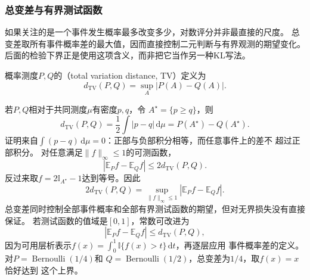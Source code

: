 \subsubsection{总变差与有界测试函数}

如果关注的是一个事件发生概率最多改变多少，对数评分并非最直接的尺度。
总变差取所有事件概率差的最大值，因而直接控制二元判断与有界观测的期望变化。
后面的检验下界正是使用这项含义，而非把它当作另一种KL写法。
\begin{definition}[总变差距离]
\label{def:information-total-variation}
概率测度\(P,Q\)的（total variation distance, TV）定义为
\begin{equation}
  d_{\mathrm{TV}}(P,Q)
  =
  \sup_{A}|P(A)-Q(A)|.
  \label{eq:information-total-variation}
\end{equation}
\end{definition}
若\(P,Q\)相对于共同测度\(\mu\)有密度\(p,q\)，令
\(A^\star=\{p\geq q\}\)，则
\begin{equation}
  d_{\mathrm{TV}}(P,Q)
  =
  \frac12\int|p-q|\,\mathrm{d}\mu
  =
  P(A^\star)-Q(A^\star).
  \label{eq:information-tv-density}
\end{equation}
证明来自\(\int(p-q)\,\mathrm{d}\mu=0\)：正部与负部积分相等，而任意事件上的差不
超过正部积分。
对任意满足\(\lVert f\rVert_\infty\leq1\)的可测函数，
\[
  |\mathbb{E}_P f-\mathbb{E}_Q f|
  \leq2d_{\mathrm{TV}}(P,Q).
\]
反过来取\(f=2\mathbb{I}_{A^\star}-1\)达到等号。因此
\begin{equation}
  2d_{\mathrm{TV}}(P,Q)
  =
  \sup_{\lVert f\rVert_\infty\leq1}
  |\mathbb{E}_P f-\mathbb{E}_Q f|.
  \label{eq:information-tv-dual}
\end{equation}
总变差同时控制全部事件概率和全部有界测试函数的期望，但对无界损失没有直接保证。
若测试函数的值域是\([0,1]\)，常数可改进为
\[
  |\mathbb{E}_P f-\mathbb{E}_Q f|
  \leq d_{\mathrm{TV}}(P,Q),
\]
因为可用层析表示\(f(x)=\int_0^1\mathbb{I}\{f(x)>t\}\,\mathrm{d}t\)，再逐层应用
事件概率差的定义。对\(P=\operatorname{Bernoulli}(1/4)\)和
\(Q=\operatorname{Bernoulli}(1/2)\)，总变差为\(1/4\)，取\(f(x)=x\)恰好达到
这个上界。
